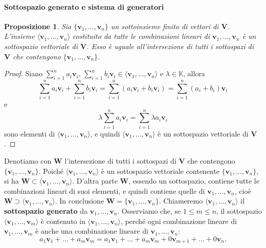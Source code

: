 \documentclass{article}
\theoremstyle{plain}
\newtheorem{prop}[thm]{Proposizione}
\theoremstyle{definition}
\theoremstyle{remark}
\begin{document}
\vspace{10pt}

\paragraph{Sottospazio generato e sistema di generatori}
\begin{bxthm}
\begin{prop}
    Sia \( \{\mathbf{v}_1, \ldots, \mathbf{v}_n\} \) un sottoinsieme finito di vettori di \( \mathbf{V} \). 
    L'insieme \( \langle\mathbf{v}_1, \ldots, \mathbf{v}_n\rangle \) costituito da tutte le combinazioni lineari di \( \mathbf{v}_1, \ldots, \mathbf{v}_n \) è un sottospazio vettoriale di \( \mathbf{V} \). 
    Esso è uguale all'intersezione di tutti i sottospazi di \( \mathbf{V} \) che contengono \( \{\mathbf{v}_1, \ldots, \mathbf{v}_n\} \).
\end{prop}
\end{bxthm}
\begin{proof}
        Siano \( \sum\limits_{i=1}^{n}a_i\mathbf{v}_i,\, \sum\limits_{i=1}^{n}b_i\mathbf{v}_i \in \langle\mathbf{v}_1, \ldots, \mathbf{v}_n\rangle \) e \( \lambda \in \mathbb{K} \), allora
        \[
            \sum_{i=1}^{n}a_i\mathbf{v}_i + \sum_{i=1}^{n}b_i\mathbf{v}_i = \sum_{i=1}^{n}(a_i\mathbf{v}_i+b_i\mathbf{v}_i) = \sum_{i=1}^{n}(a_i+b_i)\mathbf{v}_i
        \]
        e
        \[
            \lambda\sum_{i=1}^{n}a_i\mathbf{v}_i = \sum_{i=1}^{n}\lambda a_i\mathbf{v}_i
        \]
        sono elementi di \( \langle\mathbf{v}_1, \ldots, \mathbf{v}_n\rangle \), e quindi \( \langle\mathbf{v}_1, \ldots, \mathbf{v}_n\rangle \) è un sottospazio vettoriale di \( \mathbf{V} \).
\end{proof}

\vspace{10pt}

Denotiamo con \( \mathbf{W} \) l'intersezione di tutti i sottospazi di \( \mathbf{V} \) che contengono \( \{\mathbf{v}_1, \ldots, \mathbf{v}_n\} \). 
Poiché \( \langle\mathbf{v}_1, \ldots, \mathbf{v}_n\rangle \) è un sottospazio vettoriale contenente \( \{\mathbf{v}_1, \ldots, \mathbf{v}_n\} \), si ha \( \mathbf{W} \subset \langle\mathbf{v}_1, \ldots, \mathbf{v}_n\rangle \). 
D'altra parte \( \mathbf{W} \), essendo un sottospazio, contiene tutte le combinazioni lineari di suoi elementi, e quindi contiene quelle di \( \mathbf{v}_1, \ldots, \mathbf{v}_n \), cioè \( \mathbf{W} \supset \langle\mathbf{v}_1, \ldots, \mathbf{v}_n\rangle \). 
In conclusione \( \mathbf{W} = \{\mathbf{v}_1, \ldots, \mathbf{v}_n\} \).
Chiameremo \( \langle\mathbf{v}_1, \ldots, \mathbf{v}_n\rangle \) il \textbf{sottospazio generato} da \( \mathbf{v}_1, \ldots, \mathbf{v}_n \).
Osserviamo che, se \( 1 \leq m \leq n \), il sottospazio \( \langle\mathbf{v}_1, \ldots, \mathbf{v}_m\rangle \) è contenuto in 
\( \langle\mathbf{v}_1, \ldots, \mathbf{v}_n\rangle \), perché ogni combinazione lineare di \( \mathbf{v}_1, \ldots, \mathbf{v}_m \) 
è anche una combinazione lineare di \( \mathbf{v}_1, \ldots, \mathbf{v}_n \):
\[
    a_1\mathbf{v}_1 + \ldots + a_m\mathbf{v}_m = a_1\mathbf{v}_1 + \ldots + a_m\mathbf{v}_m + 0\mathbf{v}_{m+1} + \ldots + 0\mathbf{v}_n.
\]
\end{document}
